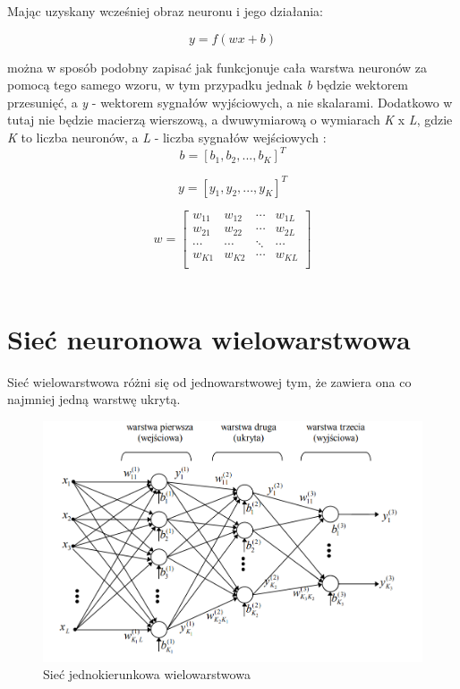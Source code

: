 \documentclass[a4paper, 12pt]{report}
\begin{document}
\newpage
Mając uzyskany wcześniej obraz neuronu i jego działania:

\[ y = f \left( {wx + b } \right) \]

 można w sposób podobny zapisać jak funkcjonuje cała warstwa neuronów za pomocą tego samego wzoru, w tym przypadku jednak \textit{b} będzie wektorem przesunięć, a \textit{y} - wektorem sygnałów wyjściowych, a nie skalarami. Dodatkowo w tutaj nie będzie macierzą wierszową, a dwuwymiarową o wymiarach \textit{K} x \textit{L}, gdzie \textit{K} to liczba neuronów, a \textit{L} - liczba sygnałów wejściowych \cite{book4}:
\[ b = [b_1, b_2, ..., b_K]^T \]

\[ y = [y_1, y_2, ..., y_K]^T \]

\[w = 
\begin{bmatrix}
  w_{11} & w_{12} & \cdots & w_{1L} \\ 
  w_{21} & w_{22} & \cdots & w_{2L} \\ 
  \cdots & \cdots & \ddots & \cdots \\ 
  w_{K1} & w_{K2} & \cdots & w_{KL} \\ 
 \end{bmatrix}
\] \\

\section{Sieć neuronowa wielowarstwowa}
Sieć wielowarstwowa różni się od jednowarstwowej tym, że zawiera ona co najmniej jedną warstwę ukrytą.

\begin{figure}[hbt!]
\includegraphics[width=15cm]{Sieci}
\centering
\caption{Sieć jednokierunkowa wielowarstwowa\cite {book6}}
\end{figure}
\end{document}
